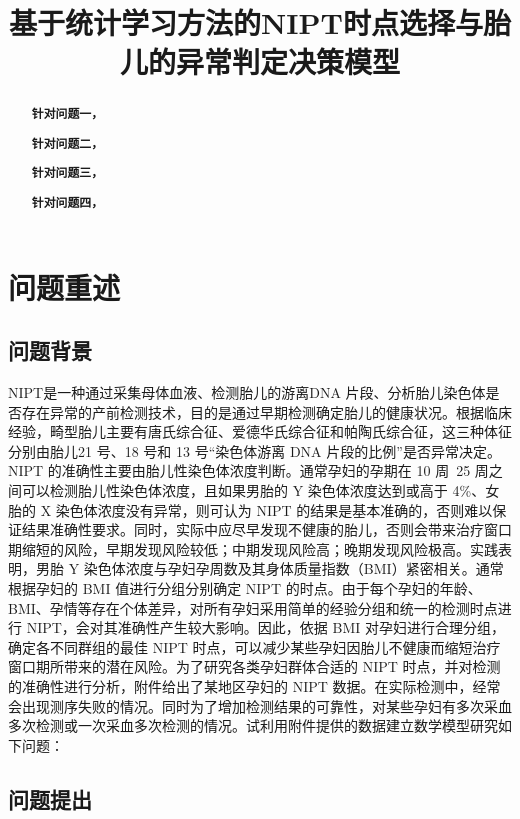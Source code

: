 \documentclass[withoutpreface,bwprint]{cumcmthesis} %
\title{基于统计学习方法的NIPT时点选择与胎儿的异常判定决策模型}
\begin{document}
\maketitle
\nocite{*}


\begin{abstract}

    \textbf{针对问题一，}

    \textbf{针对问题二，}

    \textbf{针对问题三，}

    \textbf{针对问题四，}

    \keywords{}
\end{abstract}

\section{问题重述}

\subsection{问题背景}
NIPT是一种通过采集母体血液、检测胎儿的游离DNA 片段、分析胎儿染色体是否存在异常的产前检测技术，目的是通过早期检测确定胎儿的健康状况。根据临床经验，畸型胎儿主要有唐氏综合征、爱德华氏综合征和帕陶氏综合征，这三种体征分别由胎儿21 号、18 号和 13 号“染色体游离 DNA 片段的比例”是否异常决定。NIPT 的准确性主要由胎儿性染色体浓度判断。通常孕妇的孕期在 10 周~25 周之间可以检测胎儿性染色体浓度，且如果男胎的 Y 染色体浓度达到或高于 4\%、女胎的 X 染色体浓度没有异常，则可认为 NIPT 的结果是基本准确的，否则难以保证结果准确性要求。同时，实际中应尽早发现不健康的胎儿，否则会带来治疗窗口期缩短的风险，早期发现风险较低；中期发现风险高；晚期发现风险极高。实践表明，男胎 Y 染色体浓度与孕妇孕周数及其身体质量指数（BMI）紧密相关。通常根据孕妇的
BMI 值进行分组分别确定 NIPT 的时点。由于每个孕妇的年龄、BMI、孕情等存在个体差异，对所有孕妇采用简单的经验分组和统一的检测时点进行 NIPT，会对其准确性产生较大影响。因此，依据 BMI 对孕妇进行合理分组，确定各不同群组的最佳 NIPT 时点，可以减少某些孕妇因胎儿不健康而缩短治疗窗口期所带来的潜在风险。为了研究各类孕妇群体合适的 NIPT 时点，并对检测的准确性进行分析，附件给出了某地区孕妇的 NIPT 数据。在实际检测中，经常会出现测序失败的情况。同时为了增加检测结果的可靠性，对某些孕妇有多次采血多次检测或一次采血多次检测的情况。试利用附件提供的数据建立数学模型研究如下问题：

\subsection{问题提出}
\end{document}

